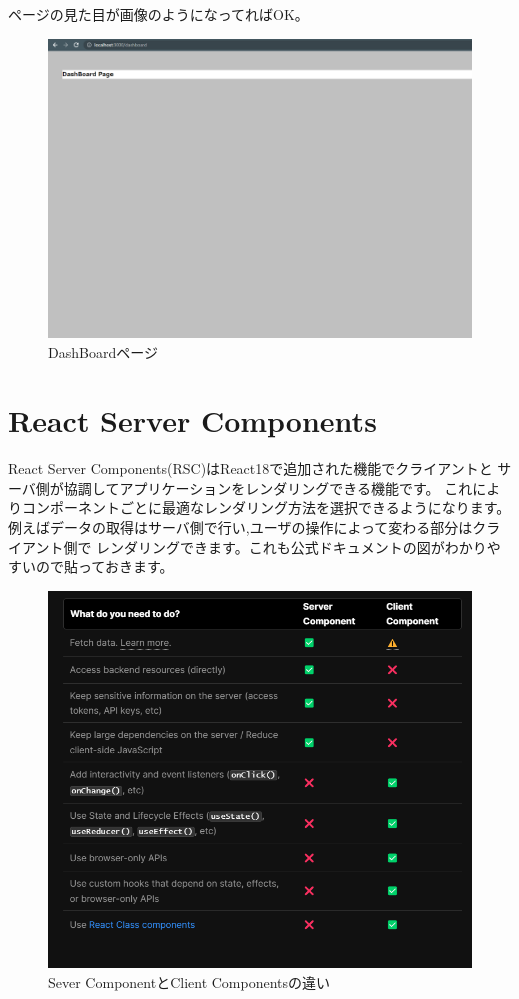 ページの見た目が画像のようになってればOK。


\begin{figure}[H]
  \centering
  \includegraphics[width=12cm]{./image/03-Tech/chap4/03.png}
  \caption{DashBoardページ}
\end{figure}










\section{React Server Components}
React Server Components(RSC)はReact18で追加された機能でクライアントと
サーバ側が協調してアプリケーションをレンダリングできる機能です。
これによりコンポーネントごとに最適なレンダリング方法を選択できるようになります。
例えばデータの取得はサーバ側で行い,ユーザの操作によって変わる部分はクライアント側で
レンダリングできます。これも公式ドキュメントの図がわかりやすいので貼っておきます。


\begin{figure}[H]
  \centering
  \includegraphics[width=12cm]{./image/03-Tech/chap4/04.png}
  \caption{Sever ComponentとClient Componentsの違い}
\end{figure}



